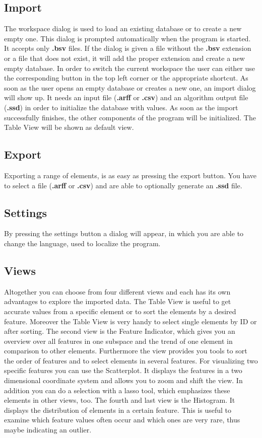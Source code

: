 \subsection{Import}
The workspace dialog is used to load an existing database or to create a new empty one. This dialog is prompted automatically when the program is started. It accepts only \textbf{.bsv} files. If the dialog is given a file without the \textbf{.bsv} extension or a file that does not exist, it will add the proper extension and create a new empty database. In order to switch the current workspace the user can either use the corresponding button in the top left corner or the appropriate shortcut.
As soon as the user opens an empty database or creates a new one, an import dialog will show up. It needs an input file (\textbf{.arff} or \textbf{.csv}) and an algorithm output file (\textbf{.ssd}) in order to initialize the database with values. As soon as the import successfully finishes, the other components of the program will be initialized. The Table View will be shown as default view.

\subsection{Export}
Exporting a range of elements, is as easy as pressing the export button. You have to select a file (\textbf{.arff} or \textbf{.csv}) and are able to optionally generate an \textbf{.ssd} file.

\subsection{Settings}
By pressing the settings button a dialog will appear, in which you are able to change the language, used to localize the program.

\subsection{Views}
Altogether you can choose from four different views and each has its own advantages to explore the imported data. The Table View is useful to get accurate values from a specific element or to sort the elements by a desired feature. Moreover the Table View is very handy to select single elements by ID or after sorting. The second view is the Feature Indicator, which gives you an overview over all features in one subspace and the trend of one element in comparison to other elements. Furthermore the view provides you tools to sort the order of features and to select elements in several features. For visualizing two specific features you can use the Scatterplot. It displays the features in a two dimensional coordinate system and allows you to zoom and shift the view. In addition you can do a selection with a lasso tool, which emphasizes these elements in other views, too. The fourth and last view is the Histogram. It displays the distribution of elements in a certain feature. This is useful to examine which feature values often occur and which ones are very rare, thus maybe indicating an outlier.

